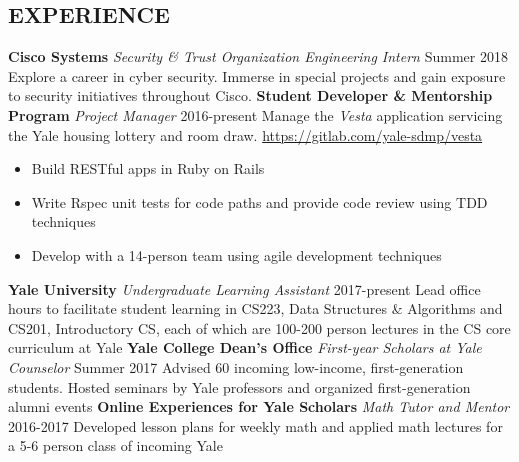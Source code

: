 \documentclass[margin, centered]{res}
\begin{document}
\begin{resume}
  \section{EXPERIENCE}
  \textbf{Cisco Systems} \textit{Security \& Trust Organization Engineering Intern} \hfill 
  Summer 2018 \newline
  Explore a career in cyber security. Immerse in special projects and gain exposure to security
  initiatives throughout Cisco.\smallskip \newline 
  \textbf{Student Developer \&  Mentorship Program} \textit{Project Manager} \hfill 2016-present \newline
  Manage the \textit{Vesta} application servicing the Yale housing lottery and room draw. \newline 
  \href{https://gitlab.com/yale-sdmp/vesta}{https://gitlab.com/yale-sdmp/vesta}\smallskip{}
  \begin{itemize}
    \item Build RESTful apps in Ruby on Rails
    \item Write Rspec unit tests for code paths and provide code review using TDD techniques
    \item Develop with a 14-person team using agile development techniques
  \end{itemize}
  \textbf{Yale University} \textit{Undergraduate Learning Assistant} \hfill 2017-present \newline
  Lead office hours to facilitate student learning in CS223, Data Structures
  \& Algorithms and CS201, Introductory CS, each of which are 100-200 person lectures in the CS core curriculum at Yale \newline 
  \textbf{Yale College Dean's Office} \textit{First-year Scholars at Yale Counselor} \hfill Summer 2017 \newline
  Advised 60 incoming low-income, first-generation students. Hosted seminars by Yale professors and organized first-generation alumni events \newline
  \textbf{Online Experiences for Yale Scholars} \textit{Math Tutor and Mentor} \hfill 2016-2017 \newline
  Developed lesson plans for weekly math and applied math lectures for a 5-6 person class of incoming Yale 


\end{resume}
\end{document}
